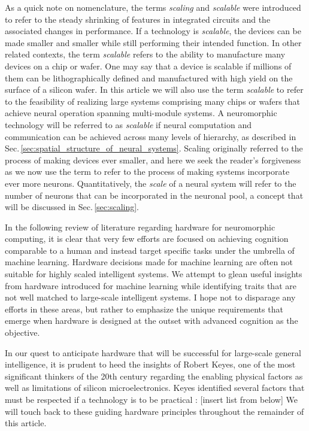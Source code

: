 As a quick note on nomenclature, the terms \textit{scaling} and \textit{scalable} were introduced to refer to the steady shrinking of features in integrated circuits and the associated changes in performance. If a technology is \textit{scalable}, the devices can be made smaller and smaller while still performing their intended function. In other related contexts, the term \textit{scalable} refers to the ability to manufacture many devices on a chip or wafer. One may say that a device is scalable if millions of them can be lithographically defined and manufactured with high yield on the surface of a silicon wafer. In this article we will also use the term \textit{scalable} to refer to the feasibility of realizing large systems comprising many chips or wafers that achieve neural operation spanning multi-module systems. A neuromorphic technology will be referred to as \textit{scalable} if neural computation and communication can be achieved across many levels of hierarchy, as described in Sec.\,\ref{sec:spatial_structure_of_neural_systems}. Scaling originally referred to the process of making devices ever smaller, and here we seek the reader's forgiveness as we now use the term to refer to the process of making systems incorporate ever more neurons. Quantitatively, the \textit{scale} of a neural system will refer to the number of neurons that can be incorporated in the neuronal pool, a concept that will be discussed in Sec.\,\ref{sec:scaling}.

In the following review of literature regarding hardware for neuromorphic computing, it is clear that very few efforts are focused on achieving cognition comparable to a human and instead target specific tasks under the umbrella of machine learning. Hardware decisions made for machine learning are often not suitable for highly scaled intelligent systems. We attempt to glean useful insights from hardware introduced for machine learning while identifying traits that are not well matched to large-scale intelligent systems. I hope not to disparage any efforts in these areas, but rather to emphasize the unique requirements that emerge when hardware is designed at the outset with advanced cognition as the objective.

In our quest to anticipate hardware that will be successful for large-scale general intelligence, it is prudent to heed the insights of Robert Keyes, one of the most significant thinkers of the 20th century regarding the enabling physical factors as well as limitations of silicon microelectronics. Keyes identified several factors that must be respected if a technology is to be practical \cite{ke1985a,ke1985b}: [insert list from below] We will touch back to these guiding hardware principles throughout the remainder of this article.


